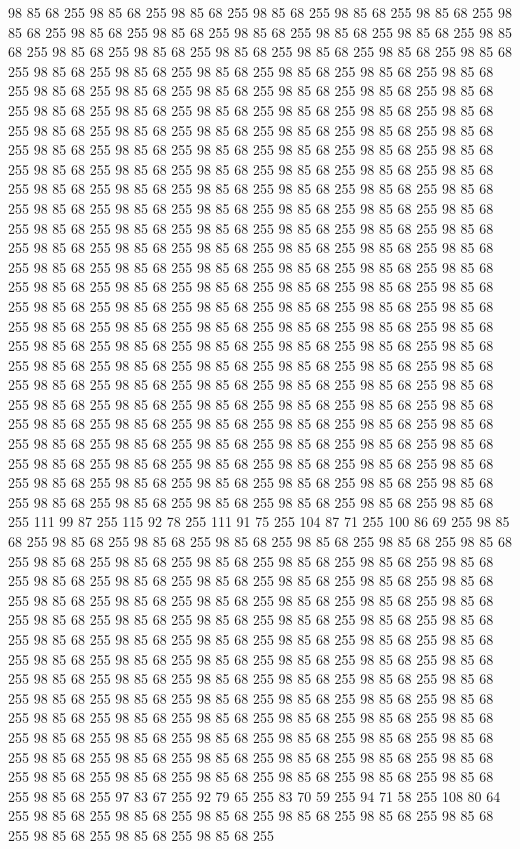98 85 68 255 98 85 68 255 98 85 68 255 98 85 68 255 98 85 68 255 98 85 68 255 98 85 68 255 98 85 68 255 98 85 68 255 98 85 68 255 98 85 68 255 98 85 68 255 98 85 68 255 98 85 68 255 98 85 68 255 98 85 68 255 98 85 68 255 98 85 68 255 98 85 68 255 98 85 68 255 98 85 68 255 98 85 68 255 98 85 68 255 98 85 68 255 98 85 68 255 98 85 68 255 98 85 68 255 98 85 68 255 98 85 68 255 98 85 68 255 98 85 68 255 98 85 68 255 98 85 68 255 98 85 68 255 98 85 68 255 98 85 68 255 98 85 68 255 98 85 68 255 98 85 68 255 98 85 68 255 98 85 68 255 98 85 68 255 98 85 68 255 98 85 68 255 98 85 68 255 98 85 68 255 98 85 68 255 98 85 68 255 98 85 68 255 98 85 68 255 98 85 68 255 98 85 68 255 98 85 68 255 98 85 68 255 98 85 68 255 98 85 68 255 98 85 68 255 98 85 68 255 98 85 68 255 98 85 68 255 98 85 68 255 98 85 68 255 98 85 68 255 98 85 68 255
98 85 68 255 98 85 68 255 98 85 68 255 98 85 68 255 98 85 68 255 98 85 68 255 98 85 68 255 98 85 68 255 98 85 68 255 98 85 68 255 98 85 68 255 98 85 68 255 98 85 68 255 98 85 68 255 98 85 68 255 98 85 68 255 98 85 68 255 98 85 68 255 98 85 68 255 98 85 68 255 98 85 68 255 98 85 68 255 98 85 68 255 98 85 68 255 98 85 68 255 98 85 68 255 98 85 68 255 98 85 68 255 98 85 68 255 98 85 68 255 98 85 68 255 98 85 68 255 98 85 68 255 98 85 68 255 98 85 68 255 98 85 68 255 98 85 68 255 98 85 68 255 98 85 68 255 98 85 68 255 98 85 68 255 98 85 68 255 98 85 68 255 98 85 68 255 98 85 68 255 98 85 68 255 98 85 68 255 98 85 68 255 98 85 68 255 98 85 68 255 98 85 68 255 98 85 68 255 98 85 68 255 98 85 68 255 98 85 68 255 98 85 68 255 98 85 68 255 98 85 68 255 98 85 68 255 98 85 68 255 98 85 68 255 98 85 68 255 98 85 68 255 98 85 68 255
98 85 68 255 98 85 68 255 98 85 68 255 98 85 68 255 98 85 68 255 98 85 68 255 98 85 68 255 98 85 68 255 98 85 68 255 98 85 68 255 98 85 68 255 98 85 68 255 98 85 68 255 98 85 68 255 98 85 68 255 98 85 68 255 98 85 68 255 98 85 68 255 98 85 68 255 98 85 68 255 98 85 68 255 98 85 68 255 98 85 68 255 98 85 68 255 98 85 68 255 98 85 68 255 98 85 68 255 98 85 68 255 98 85 68 255 111 99 87 255 115 92 78 255 111 91 75 255 104 87 71 255 100 86 69 255 98 85 68 255 98 85 68 255 98 85 68 255 98 85 68 255 98 85 68 255 98 85 68 255 98 85 68 255 98 85 68 255 98 85 68 255 98 85 68 255 98 85 68 255 98 85 68 255 98 85 68 255 98 85 68 255 98 85 68 255 98 85 68 255 98 85 68 255 98 85 68 255 98 85 68 255 98 85 68 255 98 85 68 255 98 85 68 255 98 85 68 255 98 85 68 255 98 85 68 255 98 85 68 255 98 85 68 255 98 85 68 255 98 85 68 255 98 85 68 255
98 85 68 255 98 85 68 255 98 85 68 255 98 85 68 255 98 85 68 255 98 85 68 255 98 85 68 255 98 85 68 255 98 85 68 255 98 85 68 255 98 85 68 255 98 85 68 255 98 85 68 255 98 85 68 255 98 85 68 255 98 85 68 255 98 85 68 255 98 85 68 255 98 85 68 255 98 85 68 255 98 85 68 255 98 85 68 255 98 85 68 255 98 85 68 255 98 85 68 255 98 85 68 255 98 85 68 255 98 85 68 255 98 85 68 255 98 85 68 255 98 85 68 255 98 85 68 255 98 85 68 255 98 85 68 255 98 85 68 255 98 85 68 255 98 85 68 255 98 85 68 255 98 85 68 255 98 85 68 255 98 85 68 255 98 85 68 255 98 85 68 255 98 85 68 255 98 85 68 255 98 85 68 255 98 85 68 255 98 85 68 255 98 85 68 255 98 85 68 255 97 83 67 255 92 79 65 255 83 70 59 255 94 71 58 255 108 80 64 255 98 85 68 255 98 85 68 255 98 85 68 255 98 85 68 255 98 85 68 255 98 85 68 255 98 85 68 255 98 85 68 255 98 85 68 255

